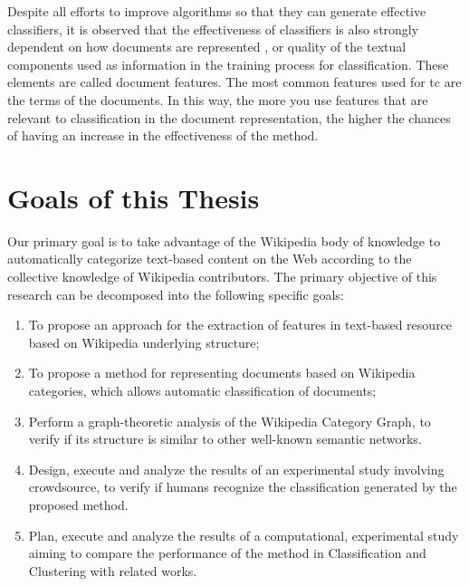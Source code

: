 Despite all efforts to improve algorithms so that they can generate effective classifiers, it is observed that the effectiveness of classifiers is also strongly dependent on how documents are represented \cite{Gabrilovich:2006, bekkerman2004using, supreethi2010novel}, or quality of the textual components used as information in the training process for classification. These elements are called document features. The most common features used for \gls{tc} are the terms of the documents. In this way, the more you use features that are relevant to classification in the document representation, the higher the chances of having an increase in the effectiveness of the method.




\section{\hspace*{3pt}Goals of this Thesis}

Our primary goal is to take advantage of the Wikipedia body of knowledge to automatically categorize text-based content on the Web according to the collective knowledge of Wikipedia contributors.
The primary objective of this research can be decomposed into the following specific goals:



\begin{enumerate}[i]
\item  To propose an approach for the extraction of features in text-based resource based on Wikipedia underlying structure;

\item To propose a method for representing  documents based on Wikipedia categories, which allows automatic classification of documents;

\item Perform a graph-theoretic analysis of the Wikipedia Category Graph, to verify if its structure is similar to other well-known semantic networks.

\item Design, execute and analyze the results of an experimental study involving crowdsource, to verify if humans recognize the classification 
generated by the proposed method.

\item Plan, execute and analyze the results of a computational, experimental study aiming to compare the performance of the method in Classification and Clustering with related works.

\end{enumerate}

